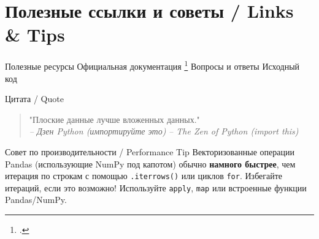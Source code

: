 \section{Полезные ссылки и советы / Links \& Tips}
\begin{myblock}{Полезные ресурсы}
 {Официальная документация \footcite{pandas_documentation}}
 {Вопросы и ответы}
 {Исходный код}
\end{myblock}

\begin{textbox}{Цитата / Quote}
\begin{quote}
"Плоские данные лучше вложенных данных." \\
\emph{-- Дзен Python (импортируйте это)}
\emph{-- The Zen of Python (import this)}
\end{quote}
\end{textbox}

\begin{alerttextbox}{Совет по производительности / Performance Tip}
Векторизованные операции Pandas (использующие NumPy под капотом) обычно \textbf{намного быстрее}, чем итерация по строкам с помощью \texttt{.iterrows()} или циклов \texttt{for}. Избегайте итераций, если это возможно! Используйте \texttt{apply}, \texttt{map} или встроенные функции Pandas/NumPy.
\end{alerttextbox}